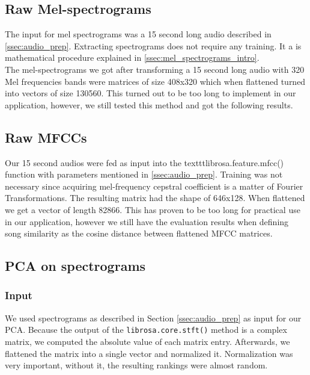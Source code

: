 \subsection{Raw Mel-spectrograms}\label{ssec:raw_mels}
The input for mel spectrograms was a 15 second long audio described in \ref{ssec:audio_prep}. Extracting spectrograms does not require any training. It a is mathematical procedure explained in \ref{ssec:mel_spectrograms_intro}. \\
The mel-spectrograms we got after transforming a 15 second long audio with 320 Mel frequencies bands were matrices of size 408x320 which when flattened turned into vectors of size 130560. This turned out to be too long to implement in our application, however, we still tested this method and got the following results. \\

\subsection{Raw MFCCs}
Our 15 second audios were fed as input into the texttt{librosa.feature.mfcc()} function with parameters mentioned in \ref{ssec:audio_prep}. Training was not necessary since acquiring mel-frequency cepstral coefficient is a matter of Fourier Transformations. The resulting matrix had the shape of 646x128. When flattened we get a vector of length 82866. This has proven to be too long for practical use in our application, however we still have the evaluation results when defining song similarity as the cosine distance between flattened MFCC matrices.

\subsection{PCA on spectrograms}

\subsubsection{Input}
We used spectrograms as described in Section \ref{ssec:audio_prep} as input for our PCA. Because the output of the \texttt{librosa.core.stft()} method is a complex matrix, we computed the absolute value of each matrix entry. Afterwards, we flattened the matrix into a single vector and normalized it. Normalization was very important, without it, the resulting rankings were almost random.

